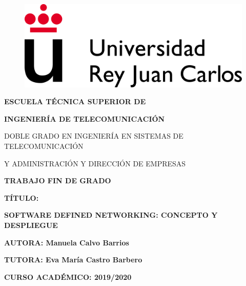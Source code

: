 \begin{titlepage}
    \begin{figure}[!h]
        \centering
        \includegraphics[scale=0.5]{./Figuras/urjc.png}
    \end{figure}
 
    \vspace{1.3cm}
    
    \centerline{{\large\bf ESCUELA TÉCNICA SUPERIOR DE}} 
    
    \vspace{0.3cm}
    
    \centerline{{\large\bf INGENIERÍA DE TELECOMUNICACIÓN}}
    
    \vspace{2cm}
    
		\centerline{\large DOBLE GRADO EN INGENIERÍA EN SISTEMAS DE TELECOMUNICACIÓN}
		\centerline{\large
			 Y ADMINISTRACIÓN Y DIRECCIÓN DE EMPRESAS} 
		
		\vspace{2cm}
		
    \centerline{\large\bf TRABAJO FIN DE GRADO}  
    \vspace{2.5cm}
    \centerline{\large\bf TÍTULO:}
    \vspace{0.5cm}
    \centerline{\large\bf 
    	SOFTWARE DEFINED NETWORKING: CONCEPTO Y DESPLIEGUE}
    \vspace{0.3cm}
    \vspace{3cm}
 	\centerline{\large
 		\bf AUTORA: Manuela Calvo Barrios}
    \vspace{0.3cm}
    \centerline{\large\bf TUTORA: Eva María Castro Barbero}
    \vspace{0.6cm}
    
    \centerline{\large\bf CURSO ACADÉMICO: 2019/2020}
    
\end{titlepage}
